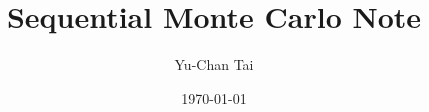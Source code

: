\documentclass{main}
\title{Sequential Monte Carlo Note}
\author{Yu-Chan Tai}
\date{\today}
\begin{document}
\maketitle


\newpage
\appendix
\renewcommand{\thesection}{S\arabic{section}}
\renewcommand{\thefigure}{S\arabic{figure}}
\renewcommand{\theequation}{S\arabic{equation}}
\setcounter{figure}{0}
\setcounter{equation}{0}

\end{document}

